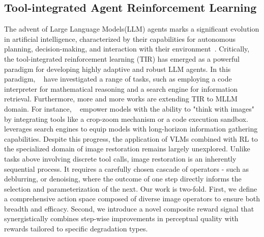 \subsection{Tool-integrated Agent Reinforcement Learning}
% 
The advent of Large Language Models(LLM) agents marks a significant evolution in artificial intelligence, characterized by their capabilities for autonomous planning, decision-making, and interaction with their environment~\cite{qu2025tool}. Critically, the tool-integrated reinforcement learning (TIR) has emerged as a powerful paradigm for developing highly adaptive and robust LLM agents. In this paradigm, ~\cite{searchr1,r1search,agentrlscaling,xue2025simpletir} have investigated a range of tasks, such as employing a code interpreter for mathematical reasoning and a search engine for information retrieval. Furthermore, more and more works are extending TIR to MLLM domain. For instance, ~\cite{su2025openthinkimg, zhang2025thyme, wang2025vrag} empower models with the ability to "think with images" by integrating tools like a crop-zoom mechanism or a code execution sandbox. ~\cite{wang2025vrag} leverages search engines to equip models with long-horizon information gathering capabilities. Despite this progress, the application of VLMs combined with RL to the specialized domain of image restoration remains largely unexplored. Unlike tasks above involving discrete tool calls, image restoration is an inherently sequential process. It requires a carefully chosen cascade of operators - such as deblurring, or denoising, where the outcome of one step directly informs the selection and parameterization of the next. 
Our work is two-fold. First, we define a comprehensive action space composed of diverse image operators to ensure both breadth and efficacy. Second, we introduce a novel composite reward signal that synergistically combines step-wise improvements in perceptual quality with rewards tailored to specific degradation types.

